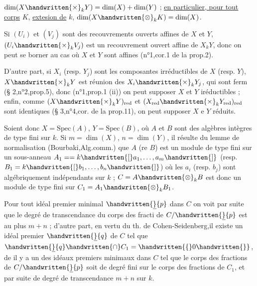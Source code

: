 $\dim(X\handwritten{\times}_k Y)=\dim(X)+\dim(Y)$ ; \uline{en particulier, pour tout corps} $K$, \uline{extesion de} $k$, $\dim(X\handwritten{\otimes}_k K)=\dim(X)$.

Si $(U_i)$ et $(V_j)$ sont des recouvrements ouverts affines de $X$ et $Y$, $(U_i\handwritten{\times}_k V_j)$ est un recouvrement ouvert affine de $X{}_kY$, donc on peut se borner au cas où $X$ et $Y$ sont affines (n°1,cor.1 de la prop.2).

D'autre part, si  $X_i$ (resp. $Y_j$) sont les composantes irréductibles de $X$ (resp. $Y$), $X\handwritten{\times}_kY$ est réunion des $X_i\handwritten{\times}_kY_j$, qui sont ferm (\S{} 2,n°2,prop.5), donc (n°1,prop.1 (ii)) on peut supposer $X$ et $Y$ iréductibles ;  enfin, comme $(X\handwritten{\times}_kY)_{\mathrm{red}}$ et $(X_{\mathrm{red}}\handwritten{\times}_kY_{\mathrm{red}})_{\mathrm{red}}$ sont identiques (\S{} 3,n°4,cor. de la prop.11), on peut supposer $X$ e $Y$ réduits.

Soient donc $X=\mathrm{Spec}(A)$, $Y=\mathrm{Spec}(B)$, où $A$ et $B$ sont des algèbres intègres de type fini sur $k$. Si $m=\dim(X)$, $n=\dim(Y)$, il résulte du lemme de normalisation (Bourbaki,Alg.comm.\qquad) que $A$ (re $B$) est  un module de type fini sur un sous-anneau $A_1=\allowbreak =k\handwritten{[}a_1,\dots,a_m\handwritten{]}$ (resp. $B_1=k\handwritten{[}b_1,\dots,b_n\handwritten{]}$) où les $a_i$ (resp. $b_j$) sont algébriquement indépendants sur $k$ ; $C=A\handwritten{\otimes}_kB$ est donc un module de type fini sur $C_1=A_1\handwritten{\otimes}_kB_1$.

Pour tout idéal premier minimal $\handwritten{\underline}{p}$  dans $C$\handwritten{,} on voit par suite que le degré de transcendance  du corps des fracti de $C/\handwritten{\underline}{p}$ est au plus $m+n$ ;  d'autre part, en vertu du th. de Cohen-Seidenberg,il existe un idéal premier $\handwritten{\underline}{q}$ de $C$ tel que $\handwritten{\underline}{q}\handwritten{\cap} C_1=\handwritten{\{}0\handwritten{\}}$, de il y a un des idéaux premiers minimaux  dans  $C$ tel que le corps des fractions de $C/\handwritten{\underline}{p}$ soit de degré fini sur le corps des fractions de $C_1$, et par suite de degré de transcendance $m+n$ sur $k$.

